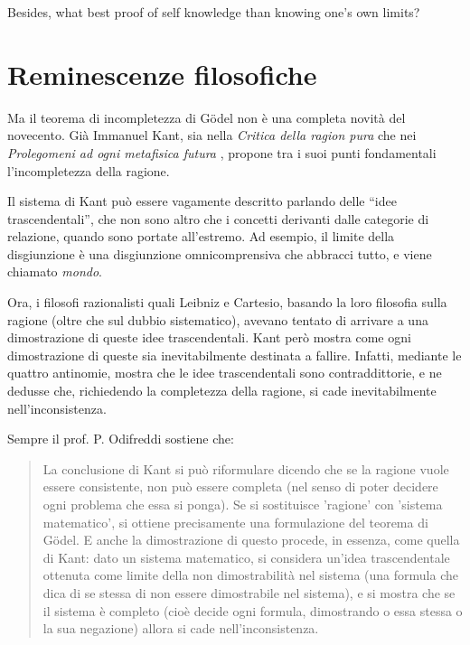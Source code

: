 \documentclass[a4paper,10pt]{article}
\begin{document}
Besides, what best proof of self knowledge than knowing one's own limits?

\section{Reminescenze filosofiche}

Ma il teorema di incompletezza di Gödel non è una completa novità del novecento. Già Immanuel Kant, sia nella \textit{Critica della ragion pura} \cite{critica-ragion-pura} che nei \textit{Prolegomeni ad ogni metafisica futura} \cite{prolegomeni}, propone tra i suoi punti fondamentali l'incompletezza della ragione.

Il sistema di Kant può essere vagamente descritto parlando delle \textquotedblleft idee trascendentali\textquotedblright, che non sono altro che i concetti derivanti dalle categorie di relazione, quando sono portate all'estremo. Ad esempio, il limite della disgiunzione è una disgiunzione omnicomprensiva che abbracci tutto, e viene chiamato \textit{mondo}.

Ora, i filosofi razionalisti quali Leibniz e Cartesio, basando la loro filosofia sulla ragione (oltre che sul dubbio sistematico), avevano tentato di arrivare a una dimostrazione di queste idee trascendentali.
Kant però mostra come ogni dimostrazione di queste sia inevitabilmente destinata a fallire. Infatti, mediante le quattro antinomie, mostra che le idee trascendentali sono contraddittorie, e ne dedusse che, richiedendo la completezza della ragione, si cade inevitabilmente nell'inconsistenza.

Sempre il prof. P. Odifreddi sostiene \cite{metamorfosi} che:
\begin{quotation}
La conclusione di Kant si può riformulare dicendo che se la ragione vuole essere consistente, non può essere completa (nel senso di
poter decidere ogni problema che essa si ponga). Se si sostituisce 'ragione' con 'sistema matematico', si ottiene precisamente una
formulazione del teorema di Gödel. E anche la dimostrazione di questo procede, in essenza, come quella di Kant: dato un
sistema matematico, si considera un'idea trascendentale ottenuta come limite della non dimostrabilità nel sistema (una formula
che dica di se stessa di non essere dimostrabile nel sistema), e si mostra che se il sistema è completo (cioè decide ogni formula,
dimostrando o essa stessa o la sua negazione) allora si cade nell'inconsistenza.

\end{quotation}
\end{document}
